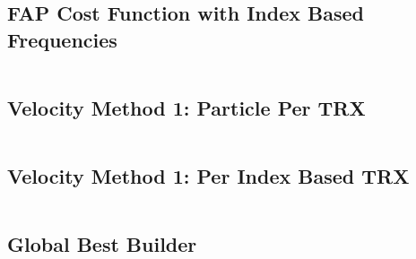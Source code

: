 \subsection{FAP Cost Function with Index Based Frequencies}
\inputminted[fontsize=\tiny]{csharp}{../Implementation/PSOFAP/PSOFAPConsole/FAPPSO/FAPIndexCostFunction.cs}
\subsection{Velocity Method 1: Particle Per TRX}
\inputminted[fontsize=\tiny]{csharp}{../Implementation/PSOFAP/PSOFAPConsole/FAPPSO/Functions/ParticlePerTrxFunction.cs}
\subsection{Velocity Method 1: Per Index Based TRX}
\inputminted[fontsize=\tiny]{csharp}{../Implementation/PSOFAP/PSOFAPConsole/FAPPSO/Functions/PerTRXChannelIndexFunction.cs}
\subsection{Global Best Builder}
\inputminted[fontsize=\tiny]{csharp}{../Implementation/PSOFAP/PSOFAPConsole/FAPPSO/GBestBuilder.cs}
